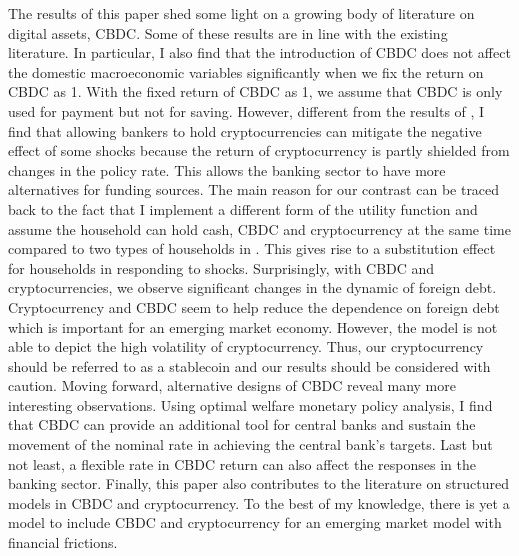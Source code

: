 \documentclass[12pt, a4paper]{article}
\begin{document}




The results of this paper shed some light on a growing body of literature on digital assets, CBDC. Some of these results are in line with the existing literature. In particular, I also find that the introduction of CBDC does not affect the domestic macroeconomic variables significantly when we fix the return on CBDC as 1. With the fixed return of CBDC as 1, we assume that CBDC is only used for payment but not for saving. However, different from the results of \cite{murakami2021cryptocurrencies}, I find that allowing bankers to hold cryptocurrencies can mitigate the negative effect of some shocks because the return of cryptocurrency is partly shielded from changes in the policy rate. This allows the banking sector to have more alternatives for funding sources. The main reason for our contrast can be traced back to the fact that I implement a different form of the utility function and assume the household can hold cash, CBDC and cryptocurrency at the same time compared to two types of households in  \cite{murakami2021cryptocurrencies}. This gives rise to a substitution effect for households in responding to shocks. Surprisingly, with CBDC and cryptocurrencies, we observe significant changes in the dynamic of foreign debt. Cryptocurrency and CBDC seem to help reduce the dependence on foreign debt which is important for an emerging market economy. However, the model is not able to depict the high volatility of cryptocurrency. Thus, our cryptocurrency should be referred to as a stablecoin and our results should be considered with caution. Moving forward, alternative designs of CBDC reveal many more interesting observations. Using optimal welfare monetary policy analysis, I find that CBDC can provide an additional tool for central banks and sustain the movement of the nominal rate in achieving the central bank's targets. Last but not least, a flexible rate in CBDC return can also affect the responses in the banking sector. Finally, this paper also contributes to the literature on structured models in CBDC and cryptocurrency. To the best of my knowledge, there is yet a model to include CBDC and cryptocurrency for an emerging market model with financial frictions.
\end{document}
